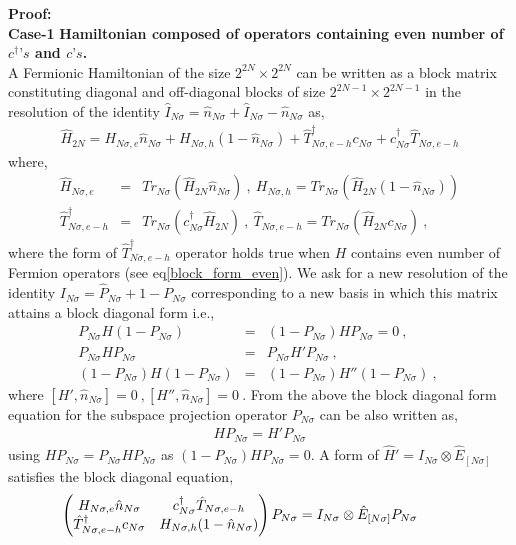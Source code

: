 \documentclass[12pt,a4paper]{article}
\begin{document}
\textbf{Proof:}\\
\textbf{Case-1} \textbf{Hamiltonian composed of operators containing even number of $c^{\dagger}\text{'}s$ and $c\text{'}s$.}\\
A Fermionic Hamiltonian  of the size $2^{2N}\times 2^{2N}$ can be written as a block matrix constituting diagonal and off-diagonal blocks of size $2^{2N-1}\times 2^{2N-1}$ in the resolution of the identity $\hat{I}_{N\sigma}=\hat{n}_{N\sigma}+\hat{I}_{N\sigma}-\hat{n}_{N\sigma}$ as,
\begin{eqnarray}
\hat{H}_{2N}=H_{N\sigma,e}\hat{n}_{N\sigma}+H_{N\sigma,h}(1-\hat{n}_{N\sigma})+\hat{T}^{\dagger}_{N\sigma,e-h}c_{N\sigma}+c^{\dagger}_{N\sigma}\hat{T}_{N\sigma,e-h}\nonumber
\end{eqnarray} 
where,
\begin{eqnarray}
\hat{H}_{N\sigma,e} &=& Tr_{N\sigma}(\hat{H}_{2N}\hat{n}_{N\sigma})~,~ H_{N\sigma,h} = Tr_{N\sigma}(\hat{H}_{2N}(1-\hat{n}_{N\sigma}))\nonumber\\
\hat{T}^{\dagger}_{N\sigma,e-h} &=& Tr_{N\sigma}(c^{\dagger}_{N\sigma}\hat{H}_{2N})~,~\hat{T}_{N\sigma,e-h} = Tr_{N\sigma}(\hat{H}_{2N}c_{N\sigma})~,\nonumber\label{block_matrix}
\end{eqnarray}
where the form of $\hat{T}^{\dagger}_{N\sigma,e-h}$ operator holds true when $H$ contains even number of Fermion operators (see eq\eqref{block_form_even}).
We ask for a new resolution of the identity $I_{N\sigma}=\hat{P}_{N\sigma}+1-P_{N\sigma}$ corresponding to a new basis in which this matrix attains a block diagonal form i.e.,
\begin{eqnarray}
P_{N\sigma}H(1-P_{N\sigma})&=&(1-P_{N\sigma})HP_{N\sigma}=0~,~\nonumber\\
 P_{N\sigma}HP_{N\sigma} &=& P_{N\sigma}H'P_{N\sigma}~,~\nonumber\\
 (1-P_{N\sigma})H(1-P_{N\sigma}) &=& (1-P_{N\sigma})H''(1-P_{N\sigma})~,~\nonumber
\end{eqnarray}
where $[H',\hat{n}_{N\sigma}]=0~,[H'',\hat{n}_{N\sigma}]=0~$. From the above the block diagonal form equation for the subspace projection operator $P_{N\sigma}$ can be also written as,
\begin{eqnarray}
HP_{N\sigma} = H'P_{N\sigma}
\end{eqnarray}
using $HP_{N\sigma} = P_{N\sigma}HP_{N\sigma}$ as $(1-P_{N\sigma})HP_{N\sigma}=0$.
 A form of $\hat{H}'=I_{N\sigma}\otimes\hat{E}_{[N\sigma]} $ satisfies the block diagonal equation,
\begin{eqnarray}
\hspace*{-1cm}
\begin{pmatrix}
			H_{N\sigma,e}\hat{n}_{N\sigma}								 & c^{\dagger}_{N\sigma}\hat{T}_{N\sigma,e-h}\\
				\hat{T}^{\dagger}_{N\sigma,e-h}c_{N\sigma}						& H_{N\sigma,h}(1-\hat{n}_{N\sigma})
											\end{pmatrix}P_{N\sigma}= I_{N\sigma}\otimes\hat{E}_{[N\sigma]}P_{N\sigma}\label{block_diagonal_eqn}
\end{eqnarray}
\end{document}
